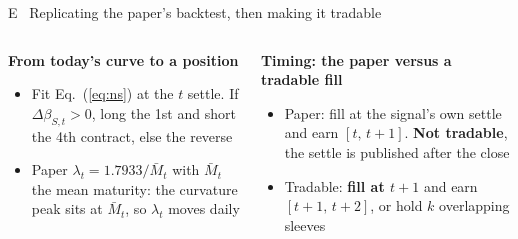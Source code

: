 \documentclass[10pt, aspectratio=169]{beamer}
\newcommand{\hl}[1]{\textcolor{accent}{#1}}
\newcommand{\key}[1]{\textcolor{accent}{\textbf{#1}}}
\begin{document}
\begin{frame}{E \textperiodcentered\ Replicating the paper's backtest, then making it tradable}
\footnotesize
\begin{columns}[T, onlytextwidth]
\begin{column}{0.49\textwidth}
\textbf{From today's curve to a position}
\begin{itemize}
  \item Fit Eq.~(\ref{eq:ns}) at the $t$ settle. \hl{If $\Delta\beta_{S,t}>0$,
        long the 1st and short the 4th contract, else the reverse}
  \item Paper $\lambda_t=1.7933/\bar M_t$ with $\bar M_t$ the mean maturity:
        the curvature peak sits at $\bar M_t$, so $\lambda_t$ moves daily
\end{itemize}
\end{column}
\begin{column}{0.49\textwidth}
\textbf{Timing: the paper versus a tradable fill}
\begin{itemize}
  \item Paper: fill at the signal's own settle and earn $[t,\,t+1]$.
        \key{Not tradable}, the settle is published after the close
  \item Tradable: \key{fill at $t+1$} and earn $[t+1,\,t+2]$, or hold $k$
        overlapping sleeves
\end{itemize}
\end{column}
\end{columns}
\vspace{-1.2ex}
\begin{table}
\centering
\scriptsize
\renewcommand{\arraystretch}{0.86}
\setlength{\tabcolsep}{3.5pt}

\caption{Slope strategy, 21 commodities, 1992--2019, \$1m. Annualized return in
percent, annualized Sharpe ($\times\sqrt{252}$) in parentheses. Paper costs per
side: TC1 \$0.75 per contract, TC2 0.835 bp of notional, TC3 TC1 plus 1/8 tick.}
\end{table}
\end{frame}
\end{document}
